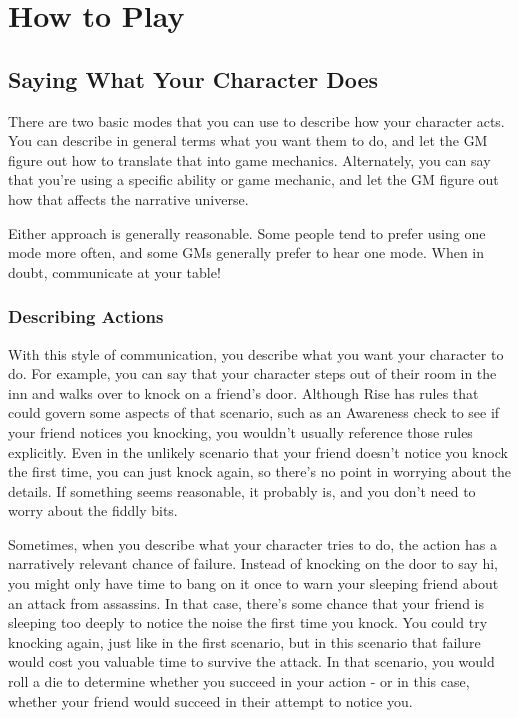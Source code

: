 \chapter{How to Play}

\section{Saying What Your Character Does}
  There are two basic modes that you can use to describe how your character acts.
  You can describe in general terms what you want them to do, and let the GM figure out how to translate that into game mechanics.
  Alternately, you can say that you're using a specific ability or game mechanic, and let the GM figure out how that affects the narrative universe.

  Either approach is generally reasonable.
  Some people tend to prefer using one mode more often, and some GMs generally prefer to hear one mode.
  When in doubt, communicate at your table!

  \subsection{Describing Actions}
    With this style of communication, you describe what you want your character to do.
    For example, you can say that your character steps out of their room in the inn and walks over to knock on a friend's door.
    Although Rise has rules that could govern some aspects of that scenario, such as an Awareness check to see if your friend notices you knocking, you wouldn't usually reference those rules explicitly.
    Even in the unlikely scenario that your friend doesn't notice you knock the first time, you can just knock again, so there's no point in worrying about the details.
    If something seems reasonable, it probably is, and you don't need to worry about the fiddly bits.

    Sometimes, when you describe what your character tries to do, the action has a narratively relevant chance of failure.
    Instead of knocking on the door to say hi, you might only have time to bang on it once to warn your sleeping friend about an attack from assassins.
    In that case, there's some chance that your friend is sleeping too deeply to notice the noise the first time you knock.
    You could try knocking again, just like in the first scenario, but in this scenario that failure would cost you valuable time to survive the attack.
    In that scenario, you would roll a die to determine whether you succeed in your action - or in this case, whether your friend would succeed in their attempt to notice you.

